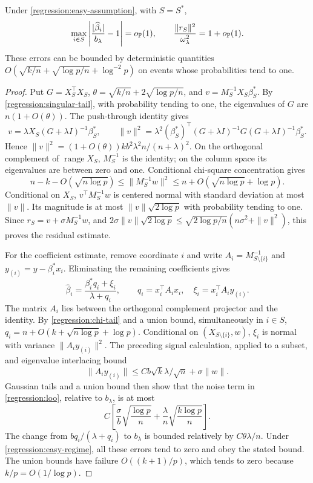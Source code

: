 \begin{lemma}\label{regression:fit-concentration}
Under \cref{regression:easy-assumption}, with $S=S^*$,
\begin{equation}\label{regression:fit-concentration-eq}
 \max_{i\in S}\left|\frac{|\widehat\beta_i|}{b_\lambda}-1\right|
 =o_{\mathbb{P}}(1),\qquad
 \frac{\|r_S\|^2}{\omega_\lambda^2}=1+o_{\mathbb{P}}(1).
\end{equation}
These errors can be bounded by deterministic quantities
$O(\sqrt{k/n}+\sqrt{\log p/n}+\log^{-2}p)$ on events whose
probabilities tend to one.
\end{lemma}
\begin{proof}
Put $G=X_S^\top X_S$, $\theta=\sqrt{k/n}+2\sqrt{\log p/n}$,
and $v=M_S^{-1}X_S\beta_S^*$. By
\eqref{regression:singular-tail}, with probability tending to one,
the eigenvalues of $G$ are $n(1+O(\theta))$.
The push-through identity gives
\[
 v=\lambda X_S(G+\lambda I)^{-1}\beta_S^*,\qquad
 \|v\|^2=\lambda^2(\beta_S^*)^\top
              (G+\lambda I)^{-1}G(G+\lambda I)^{-1}\beta_S^*.
\]
Hence
$\|v\|^2=(1+O(\theta))kb^2\lambda^2n/(n+\lambda)^2$.
On the orthogonal complement of $\operatorname{range}X_S$,
$M_S^{-1}$ is the identity; on the column space its eigenvalues
are between zero and one. Conditional chi-square concentration gives
\[
 n-k-O(\sqrt{n\log p})\leq\|M_S^{-1}w\|^2
          \leq n+O(\sqrt{n\log p}+\log p).
\]
Conditional on $X_S$, $v^\top M_S^{-1}w$ is centered normal with
standard deviation at most $\|v\|$. Its magnitude is at most
$\|v\|\sqrt{2\log p}$ with probability tending to one. Since
$r_S=v+\sigma M_S^{-1}w$, and
$2\sigma\|v\|\sqrt{2\log p}\leq
\sqrt{2\log p/n}(n\sigma^2+\|v\|^2)$, this proves the residual estimate.

For the coefficient estimate, remove coordinate $i$ and write
$A_i=M_{S\setminus\{i\}}^{-1}$ and
$y_{(i)}=y-\beta_i^*x_i$. Eliminating the remaining coefficients gives
\begin{equation}\label{regression:loo}
 \widehat\beta_i=\frac{\beta_i^*q_i+\xi_i}{\lambda+q_i},
 \qquad q_i=x_i^\top A_ix_i,\quad \xi_i=x_i^\top A_iy_{(i)}.
\end{equation}
The matrix $A_i$ lies between the orthogonal complement projector
and the identity. By \eqref{regression:chi-tail} and a union bound,
simultaneously in $i\in S$,
$q_i=n+O(k+\sqrt{n\log p}+\log p)$.
Conditional on $(X_{S\setminus\{i\}},w)$, $\xi_i$ is normal with
variance $\|A_iy_{(i)}\|^2$. The preceding signal calculation,
applied to a subset, and eigenvalue interlacing bound
\[
 \|A_iy_{(i)}\|\leq
 Cb\sqrt{k}\lambda/\sqrt n+\sigma\|w\|.
\]
Gaussian tails and a union bound then show that the noise term in
\eqref{regression:loo}, relative to $b_\lambda$, is at most
\[
 C\left[\frac{\sigma}{b}\sqrt{\frac{\log p}{n}}+
              \frac{\lambda}{n}\sqrt{\frac{k\log p}{n}}\right].
\]
The change from $bq_i/(\lambda+q_i)$ to $b_\lambda$ is bounded
relatively by $C\theta\lambda/n$. Under
\eqref{regression:easy-regime}, all these errors tend to zero and
obey the stated bound. The union bounds have failure $O((k+1)/p)$,
which tends to zero because $k/p=O(1/\log p)$.
\end{proof}


